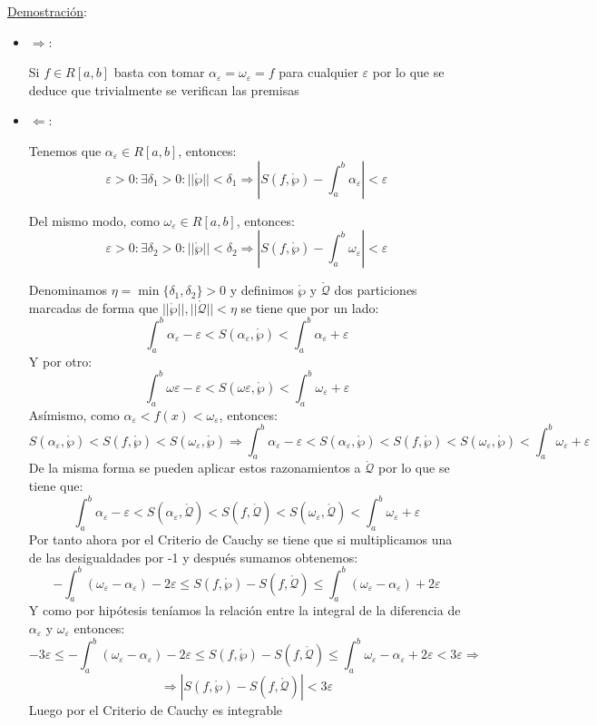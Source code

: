 \documentclass[10pt,a4paper,openright]{book}
\begin{document}
\underline{Demostración}:
\begin{itemize}
\item $\Rightarrow $:

Si $f\in R[a,b]$ basta con tomar $\alpha_\varepsilon = \omega_\varepsilon = f$ para cualquier $\varepsilon$ por lo que se deduce que trivialmente se verifican las premisas

\item $\Leftarrow$:

Tenemos que $\alpha_\varepsilon\in R[a,b]$, entonces:
$$\varepsilon > 0 :\exists \delta_1 >0: ||\mathring{\wp}||<\delta_1\Rightarrow \left|S(f,\mathring{\wp})-\int_{a}^{b}\alpha_\varepsilon \right|<\varepsilon$$

Del mismo modo, como $\omega_\varepsilon\in R[a,b]$, entonces:
$$\varepsilon >0: \exists \delta_2>0 : ||\mathring{\wp}||<\delta_2\Rightarrow \left|S(f,\mathring{\wp})- \int_{a}^{b}\omega_\varepsilon \right| <\varepsilon$$

Denominamos $\eta = \min\{\delta_1, \delta_2\} >0$ y definimos $\mathring{\wp}$ y $\mathring{\mathcal{Q}}$ dos particiones marcadas de forma que $||\mathring{\wp}||,||\mathring{\mathcal{Q}}||<\eta$ se tiene que por un lado:
$$\int_{a}^{b}\alpha_\varepsilon -\varepsilon < S(\alpha_\varepsilon, \mathring{\wp}) < \int_{a}^{b}\alpha_\varepsilon + \varepsilon$$
Y por otro:
$$\int_{a}^{b}\omega\varepsilon -\varepsilon < S(\omega\varepsilon, \mathring{\wp}) < \int_{a}^{b}\omega_\varepsilon + \varepsilon$$
Asímismo, como $\alpha_\varepsilon < f(x)< \omega_\varepsilon$, entonces:
$$S(\alpha_\varepsilon, \mathring{\wp}) < S(f,\mathring{\wp}) < S(\omega_\varepsilon, \mathring{\wp})\Rightarrow \int_{a}^{b}\alpha_\varepsilon - \varepsilon < S(\alpha_\varepsilon, \mathring{\wp}) < S(f,\mathring{\wp}) < S(\omega_\varepsilon, \mathring{\wp}) < \int_{a}^{b}\omega_\varepsilon + \varepsilon$$
De la misma forma se pueden aplicar estos razonamientos a $\mathring{\mathcal{Q}}$ por lo que se tiene que:
$$\int_{a}^{b}\alpha_\varepsilon - \varepsilon < S(\alpha_\varepsilon, \mathring{\mathcal{Q}}) < S(f,\mathring{\mathcal{Q}}) < S(\omega_\varepsilon, \mathring{\mathcal{Q}}) < \int_{a}^{b}\omega_\varepsilon + \varepsilon$$
Por tanto ahora por el Criterio de Cauchy se tiene que si multiplicamos una de las desigualdades por -1 y después sumamos obtenemos:
$$-\int_{a}^{b}(\omega_\varepsilon - \alpha_\varepsilon)-2\varepsilon \leq S(f,\mathring{\wp})- S(f,\mathring{\mathcal{Q}})\leq \int_{a}^{b}(\omega_\varepsilon - \alpha_\varepsilon) + 2\varepsilon$$
Y como por hipótesis teníamos la relación entre la integral de la diferencia de $\alpha_\varepsilon$ y $\omega_\varepsilon$ entonces:
$$-3 \varepsilon\leq -\int_{a}^{b}(\omega_\varepsilon - \alpha_\varepsilon)-2\varepsilon \leq S(f,\mathring{\wp})- S(f,\mathring{\mathcal{Q}})\leq \int_{a}^{b}\omega_\varepsilon - \alpha_\varepsilon + 2\varepsilon < 3\varepsilon\Rightarrow$$
$$\Rightarrow \left|S(f,\mathring{\wp})- S(f,\mathring{\mathcal{Q}})\right| < 3\varepsilon$$
Luego por el Criterio de Cauchy es integrable
\end{itemize}
\end{document}

